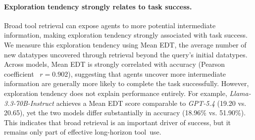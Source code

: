 \paragraph{Exploration tendency strongly relates to task success.}
Broad tool retrieval can expose agents to more potential intermediate information, making exploration tendency strongly associated with task success.
We measure this exploration tendency using Mean EDT, the average number of new datatypes uncovered through retrieval beyond the query's initial datatypes. 
Across models, Mean EDT is strongly correlated with accuracy (Pearson coefficient~\citep{Pearson} $r=0.902$), suggesting that agents uncover more intermediate information are generally more likely to complete the task successfully. 
However, exploration tendency does not explain performance entirely. 
For example, \textit{Llama-3.3-70B-Instruct} achieves a Mean EDT score comparable to \textit{GPT-5.4} (19.20 vs. 20.65), yet the two models differ substantially in accuracy (18.96\% vs. 51.90\%).
This indicates that broad retrieval is an important driver of success, but it remains only part of effective long-horizon tool~use. 





